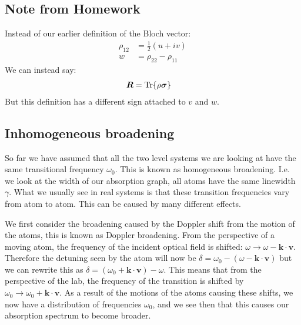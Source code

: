 \subsection*{Note from Homework}
Instead of our earlier definition of the Bloch vector:
\begin{align*}
	\rho_{12} &= \frac{1}{2}(u + iv) \\
	w &= \rho_{22} - \rho_{11}
\end{align*}
We can instead say:
\begin{align*}
	\bm{R} &= \Tr{\rho\bm{\sigma}}
\end{align*}
But this definition has a different sign attached to $v$ and $w$.
\subsection{Inhomogeneous broadening}
So far we have assumed that all the two level systems we are looking at have the same transitional frequency $\omega_0$. This is known as homogeneous broadening. I.e. we look at the width of our absorption graph, all atoms have the same linewidth $\gamma$.
What we usually see in real systems is that these transition frequencies vary from atom to atom. This can be caused by many different effects.

We first consider the broadening caused by the Doppler shift from the motion of the atoms, this is known as Doppler broadening. From the perspective of a moving atom, the frequency of the incident optical field is shifted: $\omega \to \omega - \bm{k}\cdot\bm{v}$.
Therefore the detuning seen by the atom will now be $\delta = \omega_0 - (\omega - \bm{k}\cdot\bm{v})$ but we can rewrite this as $\delta = (\omega_0 + \bm{k}\cdot\bm{v}) - \omega$.
This means that from the perspective of the lab, the frequency of the transition is shifted by $\omega_0 \to \omega_0 + \bm{k}\cdot\bm{v}$. As a result of the motions of the atoms causing these shifts, we now have a distribution of frequencies $\omega_0$,
and we see then that this causes our absorption spectrum to become broader.

